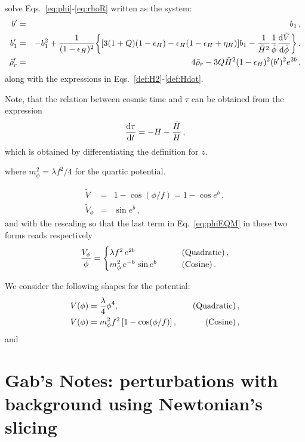 solve Eqs.~\eqref{eq:phi}-\eqref{eq:rhoR} written as the system:
\begin{eqnarray}
    b' &=& b_1\,,\\
    b_1' &=& - b_1^2 + \frac{1}{(1-\epsilon_H)^2}\bigg\{[3(1+Q)(1-\epsilon_H)-\epsilon_H(1-\epsilon_H+\eta_H)]b_1 - \frac{1}{\tilde H^2}\frac{1}{\tilde\phi}\frac{{\rm d}\tilde V}{{\rm d}\tilde\phi}\bigg\} \,,\\
    \tilde \rho_r' &=& 4\tilde \rho_r - 3Q \tilde H^2(1-\epsilon_H)^2 (b')^2e^{2b}\,,
\end{eqnarray}
along with the expressions in Eqs.~\eqref{def:H2}-\eqref{def:Hdot}.

Note, that the relation between cosmic time and $\tau$ can be obtained from the expression
\begin{equation}
    \frac{{\rm d}\tau}{{\rm d}t} = - H - \frac{\dot H}{H}\,,
\end{equation}
which is obtained by differentiating the definition for $z$.


 where $m_\phi^2 = \lambda f^2/4$ for the quartic potential.

\begin{eqnarray}
    \tilde V &=& 1-\cos(\phi/f) = 1 - \cos e^b\,,\\
    \tilde V_\phi &=& \sin e^b\,,
\end{eqnarray}
and with the rescaling
so that the last term in Eq.~\eqref{eq:phiEQM} in these two forms reads respectively
\begin{equation}
    \label{eq:Vcases}
    \frac{V_\phi}{\phi} =
    \begin{cases}
        \lambda f^2\,e^{2b}\qquad &\hbox{(Quadratic)}\,,\\
        m_\phi^2\,e^{-b}\,\sin e^b\qquad &\hbox{(Cosine)}\,.
    \end{cases}
\end{equation}



We consider the following shapes for the potential:
\begin{align}
    V(\phi) &= \frac{\lambda}{4}\phi^4, \quad & \hbox{(Quadratic)}\,,\\
    V(\phi) &= m_\phi^2f^2\left[1-\cos(\phi/f)\right], \quad & \hbox{(Cosine)}\,,
\end{align}
and 




\clearpage
\section{Gab's Notes: perturbations with background using Newtonian's slicing}
